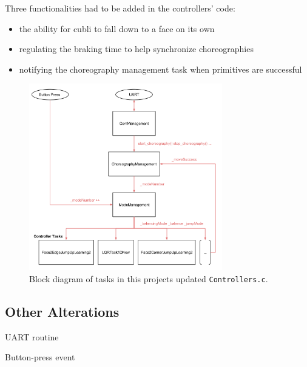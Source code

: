 Three functionalities had to be added in the controllers' code:
\begin{itemize}
\item the ability for cubli to fall down to a face on its own
\item regulating the braking time to help synchronize choreographies
\item notifying the choreography management task when primitives are successful
\end{itemize}

\begin{figure}[ht]
   \centering
   \includegraphics[width=0.75\textwidth]{img/ControllersChoreography.png}
   \caption{Block diagram of tasks in this projects updated \texttt{Controllers.c}.}
   \label{img:ControllersChoreography}
\end{figure}

\subsection{Other Alterations}

UART routine

Button-press event


    



